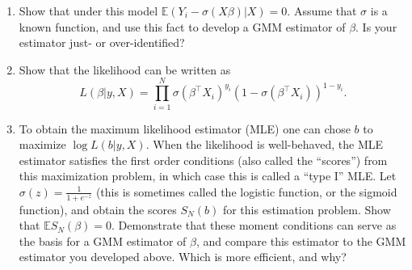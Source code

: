 \documentclass[12pt]{amsart}
\newcommand{\T}{\top}
\renewcommand{\E}{\ensuremath{\mathds{E}}}
\begin{document}
\begin{enumerate}
\item Show that under this model \(\E(Y_i-\sigma(X\beta)|X)=0\).  Assume that \(\sigma\) is a known function, and use this fact to develop a GMM estimator of \(\beta\).  Is your estimator just- or over-identified?

\item Show that the likelihood can be written as
\[
            L(\beta|y,X) = \prod_{i=1}^N\sigma(\beta^\T X_i)^{y_i}\left(1-\sigma(\beta^\T X_i)\right)^{1-y_i}.
       \]
\item To obtain the maximum likelihood estimator (MLE) one can chose \(b\) to maximize \(\log L(b|y,X)\). When the likelihood is well-behaved, the MLE estimator satisfies the first order conditions (also called the ``scores'') from this maximization problem, in which case this is called a ``type I'' MLE.  Let \(\sigma(z)=\frac{1}{1+e^{-z}}\) (this is sometimes called the logistic function, or the sigmoid function), and obtain the scores \(S_N(b)\) for this estimation problem.  Show that \(\E S_N(\beta) = 0\).  Demonstrate that these moment conditions can serve as the basis for a GMM estimator of \(\beta\), and compare this estimator to the GMM estimator you developed above.  Which is more efficient, and why?
\end{enumerate}
\printbibliography
\end{document}
